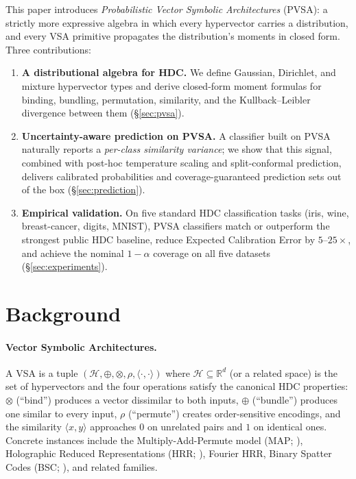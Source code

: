 \documentclass[11pt]{article}
\begin{document}
This paper introduces \emph{Probabilistic Vector Symbolic Architectures}
(PVSA): a strictly more expressive algebra in which every hypervector
carries a distribution, and every VSA primitive propagates the
distribution's moments in closed form. Three contributions:

\begin{enumerate}
\item \textbf{A distributional algebra for HDC.} We define Gaussian,
Dirichlet, and mixture hypervector types and derive closed-form moment
formulas for binding, bundling, permutation, similarity, and the
Kullback--Leibler divergence between them (\S\ref{sec:pvsa}).

\item \textbf{Uncertainty-aware prediction on PVSA.} A classifier built
on PVSA naturally reports a \emph{per-class similarity variance}; we
show that this signal, combined with post-hoc temperature scaling and
split-conformal prediction, delivers calibrated probabilities and
coverage-guaranteed prediction sets out of the box
(\S\ref{sec:prediction}).

\item \textbf{Empirical validation.} On five standard HDC classification
tasks (iris, wine, breast-cancer, digits, MNIST), PVSA classifiers
match or outperform the strongest public HDC baseline, reduce Expected
Calibration Error by $5$--$25\times$, and achieve the nominal
$1 - \alpha$ coverage on all five datasets (\S\ref{sec:experiments}).
\end{enumerate}

\section{Background}
\label{sec:background}

\paragraph{Vector Symbolic Architectures.} A VSA is a tuple
$(\mathcal{H}, \oplus, \otimes, \rho, \langle \cdot, \cdot \rangle)$
where $\mathcal{H} \subseteq \mathbb{R}^d$ (or a related space) is the
set of hypervectors and the four operations satisfy the canonical HDC
properties: $\otimes$ (``bind'') produces a vector dissimilar to both
inputs, $\oplus$ (``bundle'') produces one similar to every input,
$\rho$ (``permute'') creates order-sensitive encodings, and the
similarity $\langle x, y \rangle$ approaches $0$ on unrelated pairs
and $1$ on identical ones. Concrete instances include the Multiply-Add-Permute
model (MAP; \citealp{gayler2003vsa}), Holographic Reduced Representations
(HRR; \citealp{plate1995holographic}), Fourier HRR, Binary Spatter
Codes (BSC; \citealp{kanerva1997fully}), and related families.
\end{document}

